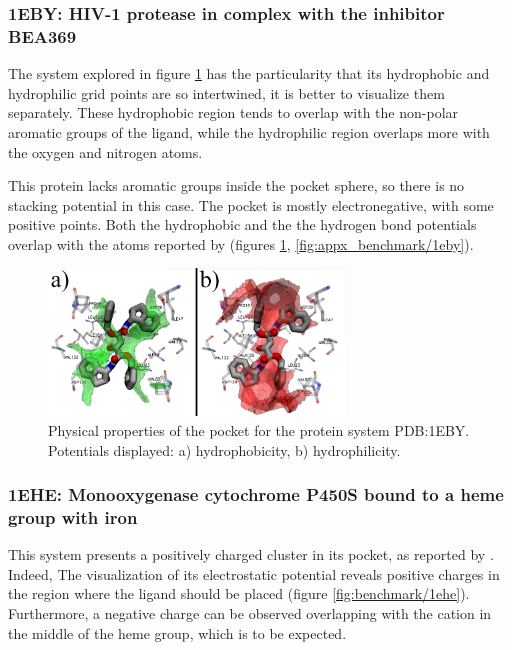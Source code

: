     \subsubsection{1EBY: HIV-1 protease in complex with the inhibitor BEA369}
      The system explored in figure \ref{fig:benchmark/1eby} has the particularity that its hydrophobic and hydrophilic grid points are so intertwined, it is better to visualize them separately. These hydrophobic region tends to overlap with the non-polar aromatic groups of the ligand, while the hydrophilic region overlaps more with the oxygen and nitrogen atoms.

      This protein lacks aromatic groups inside the pocket sphere, so there is no stacking potential in this case. The pocket is mostly electronegative, with some positive points. Both the hydrophobic and the the hydrogen bond potentials overlap with the atoms reported by \cite{benchmark_strong_2021} (figures \ref{fig:benchmark/1eby}, \ref{fig:appx_benchmark/1eby}).

      \begin{figure}[H]
        \centering
        \includegraphics[width=0.7\textwidth]{figures/results/benchmark_prot/1eby.png}
        \caption{\label{fig:benchmark/1eby} Physical properties of the pocket for the protein system PDB:1EBY. Potentials displayed: a) hydrophobicity, b) hydrophilicity.}
      \end{figure}

    \subsubsection{1EHE: Monooxygenase cytochrome P450S bound to a heme group with iron}
      This system presents a positively charged cluster in its pocket, as reported by \cite{benchmark_positive_2001}. Indeed, The visualization of its electrostatic potential reveals positive charges in the region where the ligand should be placed (figure \ref{fig:benchmark/1ehe}). Furthermore, a negative charge can be observed overlapping with the cation in the middle of the heme group, which is to be expected.

